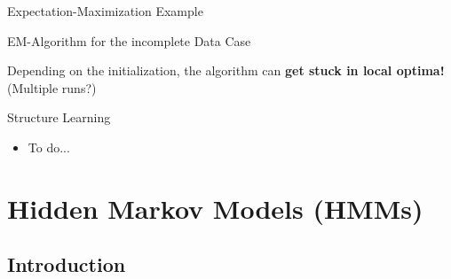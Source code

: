 \begin{frame}{Expectation-Maximization Example}{}
\end{frame}


\begin{frame}{EM-Algorithm for the incomplete Data Case}{}
	
	
	\vspace*{2mm}
	\begin{boxBlueNoFrame}
		 Depending on the initialization, the algorithm can \textbf{get stuck in local optima!}
		(Multiple runs?)
	\end{boxBlueNoFrame}
\end{frame}


\begin{frame}{Structure Learning}{}
	\begin{itemize}
		\item To do...
	\end{itemize}
\end{frame}


\section{Hidden Markov Models (HMMs)}

\subsection{Introduction}

